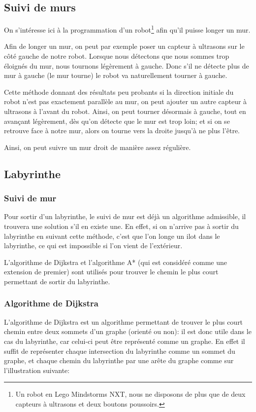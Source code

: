 \subsection{Suivi de murs}
  On s'intéresse ici à la programmation d'un robot\footnote{Un robot en Lego
  Mindstorms NXT, nous ne disposons de plus que de deux capteurs à ultrasons et
  deux boutons poussoirs.} afin qu'il puisse longer un mur.

  Afin de longer un mur, on peut par exemple poser un capteur à ultrasons sur
  le côté gauche de notre robot. Lorsque nous détectons que nous sommes trop
  éloignés du mur, nous tournons légèrement à gauche. Donc s'il ne détecte plus
  de mur à gauche (le mur tourne) le robot va naturellement tourner à gauche.

  Cette méthode donnant des résultats peu probants si la direction initiale du
  robot n'est pas exactement parallèle au mur, on peut ajouter un autre capteur
  à ultrasons à l'avant du robot. Ainsi, on peut tourner désormais à gauche,
  tout en avançant légèrement, dès qu'on détecte que le mur est trop loin; et
  si on se retrouve face à notre mur, alors on tourne vers la droite jusqu'à ne
  plus l'être.

  Ainsi, on peut suivre un mur droit de manière assez régulière.

\subsection{Labyrinthe}\label{sec:laby}
  \subsubsection{Suivi de mur}
    Pour sortir d'un labyrinthe, le suivi de mur est déjà un algorithme
    admissible, il trouvera une solution s'il en existe une. En effet, si on
    n'arrive pas à sortir du labyrinthe en suivant cette méthode, c'est que
    l'on longe un ilot dans le labyrinthe, ce qui est impossible si l'on vient
    de l'extérieur.

    L'algorithme de Dijkstra et l'algorithme A* (qui est considéré comme une
    extension de premier) sont utilisés pour trouver le chemin le plus court
    permettant de sortir du labyrinthe.

  \subsubsection{Algorithme de Dijkstra}
    L'algorithme de Dijkstra est un algorithme permettant de trouver le plus
    court chemin entre deux sommets d'un graphe (orienté ou non): il est donc
    utile dans le cas du labyrinthe, car celui-ci peut être représenté comme un
    graphe. En effet il suffit de représenter chaque intersection du labyrinthe
    comme un sommet du graphe, et chaque chemin du labyrinthe par une arête du
    graphe comme sur l'illustration suivante:

